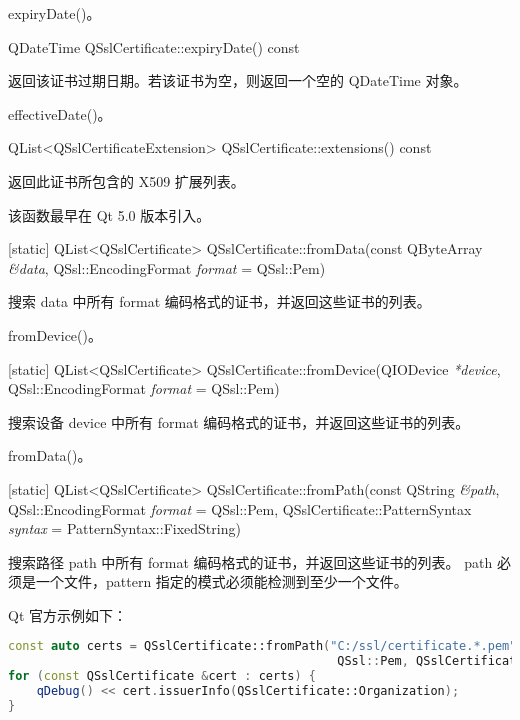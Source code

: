 \begin{seeAlso}
expiryDate()。
\end{seeAlso}

QDateTime QSslCertificate::expiryDate() const

返回该证书过期日期。若该证书为空，则返回一个空的 QDateTime 对象。

\begin{seeAlso}
effectiveDate()。
\end{seeAlso}

QList<QSslCertificateExtension> QSslCertificate::extensions() const

返回此证书所包含的 X509 扩展列表。

该函数最早在 Qt 5.0 版本引入。

[static] QList<QSslCertificate> QSslCertificate::fromData(const QByteArray \emph{\&data},
QSsl::EncodingFormat \emph{format} = QSsl::Pem)

搜索 data 中所有 format 编码格式的证书，并返回这些证书的列表。

\begin{seeAlso}
fromDevice()。
\end{seeAlso}

[static] QList<QSslCertificate> QSslCertificate::fromDevice(QIODevice \emph{*device}, 
QSsl::EncodingFormat \emph{format} = QSsl::Pem)

搜索设备 device 中所有 format 编码格式的证书，并返回这些证书的列表。

\begin{seeAlso}
fromData()。
\end{seeAlso}

[static] QList<QSslCertificate> QSslCertificate::fromPath(const QString \emph{\&path}, 
QSsl::EncodingFormat \emph{format} = QSsl::Pem, 
QSslCertificate::PatternSyntax \emph{syntax} = PatternSyntax::FixedString)

搜索路径 path 中所有 format 编码格式的证书，并返回这些证书的列表。 
path 必须是一个文件，pattern 指定的模式必须能检测到至少一个文件。

Qt 官方示例如下：

\begin{lstlisting}[language=C++]
const auto certs = QSslCertificate::fromPath("C:/ssl/certificate.*.pem",
                                              QSsl::Pem, QSslCertificate::Wildcard);
for (const QSslCertificate &cert : certs) {
    qDebug() << cert.issuerInfo(QSslCertificate::Organization);
}
\end{lstlisting}

